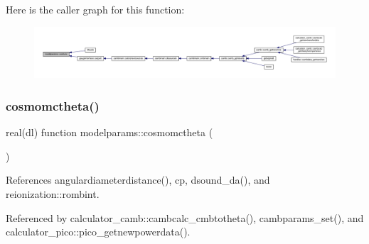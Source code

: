 Here is the caller graph for this function\+:
\nopagebreak
\begin{figure}[H]
\begin{center}
\leavevmode
\includegraphics[width=350pt]{namespacemodelparams_af941ff2f9683e6bf6994f87b27ea9427_icgraph}
\end{center}
\end{figure}
\mbox{\label{namespacemodelparams_ab4a4cc860939dbbdc0236048b5f9457e}} 
\subsubsection{\texorpdfstring{cosmomctheta()}{cosmomctheta()}}
{\footnotesize\ttfamily real(dl) function modelparams\+::cosmomctheta (\begin{DoxyParamCaption}{ }\end{DoxyParamCaption})}



References angulardiameterdistance(), cp, dsound\+\_\+da(), and reionization\+::rombint.



Referenced by calculator\+\_\+camb\+::cambcalc\+\_\+cmbtotheta(), cambparams\+\_\+set(), and calculator\+\_\+pico\+::pico\+\_\+getnewpowerdata().

